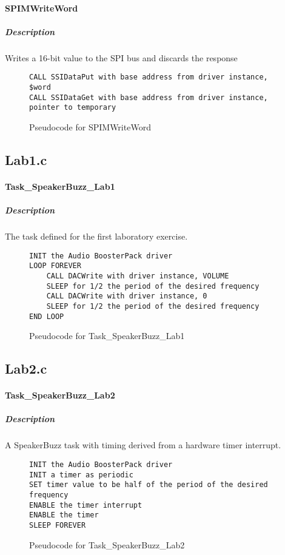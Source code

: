 \documentclass[titlepage]{article}
\begin{document}
\paragraph{SPIMWriteWord}
\subparagraph{Description}
Writes a 16-bit value to the SPI bus and discards the response
\begin{figure}[H]
    \begin{verbatim}
CALL SSIDataPut with base address from driver instance, $word
CALL SSIDataGet with base address from driver instance, pointer to temporary
    \end{verbatim}
    \caption{Pseudocode for SPIMWriteWord}
\end{figure}

\subsection{Lab1.c}
\paragraph{Task\_SpeakerBuzz\_Lab1}
\subparagraph{Description}
The task defined for the first laboratory exercise.
\begin{figure}[H]
    \begin{verbatim}
INIT the Audio BoosterPack driver
LOOP FOREVER
    CALL DACWrite with driver instance, VOLUME
    SLEEP for 1/2 the period of the desired frequency
    CALL DACWrite with driver instance, 0
    SLEEP for 1/2 the period of the desired frequency
END LOOP
    \end{verbatim}
    \caption{Pseudocode for Task\_SpeakerBuzz\_Lab1}
\end{figure}

\subsection{Lab2.c}

\paragraph{Task\_SpeakerBuzz\_Lab2}

\subparagraph{Description}
A SpeakerBuzz task with timing derived from a hardware timer interrupt.

\begin{figure}[H]
    \begin{verbatim}
INIT the Audio BoosterPack driver
INIT a timer as periodic
SET timer value to be half of the period of the desired frequency
ENABLE the timer interrupt
ENABLE the timer
SLEEP FOREVER
    \end{verbatim}
    \caption{Pseudocode for Task\_SpeakerBuzz\_Lab2}
\end{figure}
\end{document}
